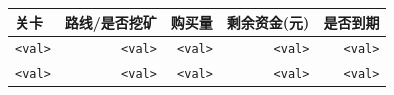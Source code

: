 \begin{tabular}{lrrrr}
\toprule
\textbf{关卡} & \textbf{路线/是否挖矿} & \textbf{购买量} & \textbf{剩余资金(元)} & \textbf{是否到期} \\\midrule
\texttt{<val>} & \texttt{<val>} & \texttt{<val>} & \texttt{<val>} & \texttt{<val>} \\
\texttt{<val>} & \texttt{<val>} & \texttt{<val>} & \texttt{<val>} & \texttt{<val>} \\\bottomrule
\end{tabular}
